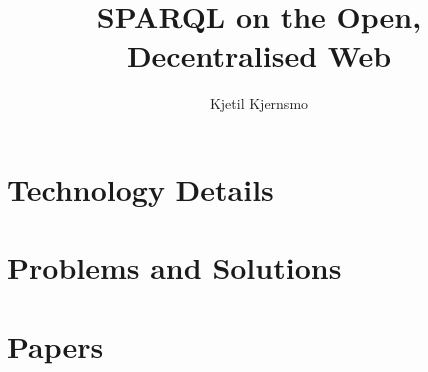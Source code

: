 \documentclass[a4paper, 12pt]{uiophd}
\begin{document}
\title{SPARQL on the Open, Decentralised Web}
\author{Kjetil Kjernsmo}


\frontmatter
\maketitle




\tableofcontents
\mainmatter






\chapter{Technology Details}



\chapter{Problems and Solutions}









\chapter{Papers}







\end{document}
